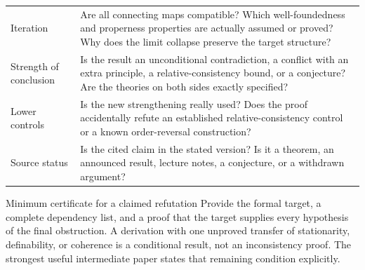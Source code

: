 \documentclass[11pt,letterpaper]{article}
\theoremstyle{definition}
\begin{document}
\begin{longtable}{@{}P{.24\textwidth}P{.69\textwidth}@{}}
Iteration & Are all connecting maps compatible? Which well-foundedness and properness properties are actually assumed or proved? Why does the limit collapse preserve the target structure?\\[4pt]
Strength of conclusion & Is the result an unconditional contradiction, a conflict with an extra principle, a relative-consistency bound, or a conjecture? Are the theories on both sides exactly specified?\\[4pt]
Lower controls & Is the new strengthening really used? Does the proof accidentally refute an established relative-consistency control or a known order-reversal construction?\\[4pt]
Source status & Is the cited claim in the stated version? Is it a theorem, an announced result, lecture notes, a conjecture, or a withdrawn argument?\\
\bottomrule
\end{longtable}
\endgroup

\begin{assessment}{Minimum certificate for a claimed refutation}
Provide the formal target, a complete dependency list, and a proof that the target supplies every hypothesis of the final obstruction. A derivation with one unproved transfer of stationarity, definability, or coherence is a conditional result, not an inconsistency proof. The strongest useful intermediate paper states that remaining condition explicitly.
\end{assessment}
\end{document}
